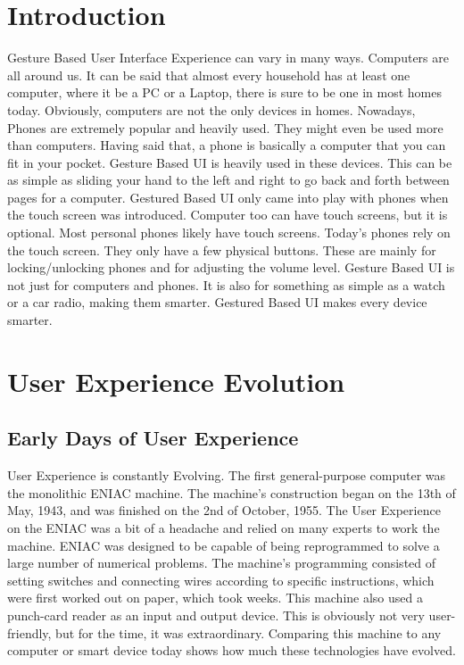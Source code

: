 \documentclass{article}
\begin{document}
\section{Introduction}
Gesture Based User Interface Experience can vary in many ways. Computers are all around us. It can be said that almost every household has at least one computer, where it be a PC or a Laptop, there is sure to be one in most homes today. Obviously, computers are not the only devices in homes. Nowadays, Phones are extremely popular and heavily used. They might even be used more than computers. Having said that, a phone is basically a computer that you can fit in your pocket. Gesture Based UI is heavily used in these devices. This can be as simple as sliding your hand to the left and right to go back and forth between pages for a computer. Gestured Based UI only came into play with phones when the touch screen was introduced. Computer too can have touch screens, but it is optional. Most personal phones likely have touch screens. Today's phones rely on the touch screen. They only have a few physical buttons. These are mainly for locking/unlocking phones and for adjusting the volume level. Gesture Based UI is not just for computers and phones. It is also for something as simple as a watch or a car radio, making them smarter. Gestured Based UI makes every device smarter.

\section{User Experience Evolution}

\subsection{Early Days of User Experience}
User Experience is constantly Evolving. The first general-purpose computer was the monolithic ENIAC machine. The machine's construction began on the 13th of May, 1943, and was finished on the 2nd of October, 1955. The User Experience on the ENIAC was a bit of a headache and relied on many experts to work the machine. ENIAC was designed to be capable of being reprogrammed to solve a large number of numerical problems. The machine's programming consisted of setting switches and connecting wires according to specific instructions, which were first worked out on paper, which took weeks. This machine also used a punch-card reader as an input and output device. This is obviously not very user-friendly, but for the time, it was extraordinary. Comparing this machine to any computer or smart device today shows how much these technologies have evolved.
\cite{ref1}
\end{document}

